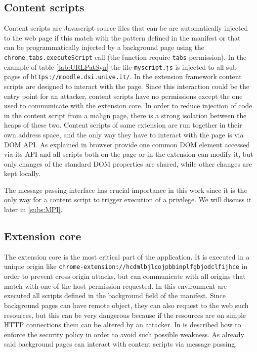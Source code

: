 \subsection{Content scripts}
Content scripts are Javascript source files that can be are automatically injected to the web page if this match with the pattern defined in the manifest or that can be programmatically injected by a background page using the \texttt{chrome.tabs.executeScript} call (the function require \texttt{tabs} permission). In the example of table \ref{tab:URLPatSyn} the file \texttt{myscript.js} is injected to all sub-pages of \texttt{https://moodle.dsi.unive.it/}. In the extension framework content scripts are designed to interact with the page. Since this interaction could be the entry point for an attacker, content scripts have no permissions except the one used to communicate with the extension core. In order to reduce injection of code in the content script from a malign page, there is a strong isolation between the heaps of these two. Content scripts of same extension are run together in their own address space, and the only way they have to interact with the page is via DOM API. As explained in \cite{ChromeExtSpec} browser provide one common DOM element accessed via its API and all scripts both on the page or in the extension can modify it, but only changes of the standard DOM properties are shared, while other changes are kept locally. 

The message passing interface has crucial importance in this work since it is the only way for a content script to trigger execution of a privilege. We will discuss it later in \ref{subs:MPI}.

\subsection{Extension core}
The extension core is the most critical part of the application. It is executed in a unique origin like \texttt{chrome-extension://hcdmlbjlcojpbbinplfgbjodclfijhce} in order to prevent cross origin attacks, but can communicate with all origins that match with one of the host permission requested. In this environment are executed all scripts defined in the background field of the manifest. Since background pages can have remote object, they can also request to the web such resources, but this can be very dangerous because if the resources are on simple HTTP connections them can be altered by an attacker. In \cite{ChromeExtSpecSnd} is described how to enforce the security policy in order to avoid such possible weakness. As already said background pages can interact with content scripts via message passing.

